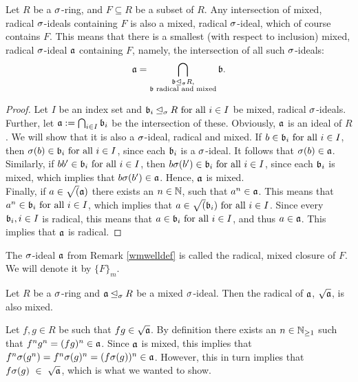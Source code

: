 \begin{rem}\label{wmwelldef}
Let $R$ be a $\sigma$-ring, and $F \subseteq R$ be a subset of $R$. Any intersection of mixed, radical $\sigma$-ideals containing $F$ is also a mixed, radical $\sigma$-ideal, which of course contains $F$. 
This means that there is a smallest (with respect to inclusion) mixed, radical $\sigma$-ideal $\mathfrak{a}$ containing $F$, namely, the intersection of all such $\sigma$-ideals:
\begin{align*} \mathfrak{a} = \bigcap_{\substack{ \mathfrak{b} \unlhd_{\sigma} R, \\ \mathfrak{b} \text{ radical and mixed}}} \mathfrak{b}. \end{align*}
\begin{proof}
Let $I$ be an index set and $\mathfrak{b}_i \unlhd_{\sigma} R \text{ for all } i \in I$ be mixed, radical $\sigma$-ideals. Further, let $\mathfrak{a} := \bigcap_{i \in I} \mathfrak{b}_i$ be the intersection of these. Obviously, $\mathfrak{a}$ is an ideal of $R$. We will show that it is also a $\sigma$-ideal, radical and mixed.
If $b \in \mathfrak{b}_i \text{ for all } i \in I$, then $\sigma(b) \in \mathfrak{b}_i \text{ for all } i \in I$, since each $\mathfrak{b}_i$ is a $\sigma$-ideal.
It follows that $\sigma(b) \in \mathfrak{a}$. \\
\indent Similarly, if $bb' \in \mathfrak{b}_i \text{ for all } i \in I$, then $b \sigma(b') \in \mathfrak{b}_i \text{ for all } i \in I$, since each $\mathfrak{b}_i$ is mixed, which implies that $b \sigma(b') \in \mathfrak{a}$. Hence, $\mathfrak{a}$ is mixed.  \\
\indent Finally, if $a \in \sqrt(\mathfrak{a})$ there exists an $n \in \mathbb{N}$, such that $a^n \in \mathfrak{a}$. This means that $a^n \in \mathfrak{b}_i \text{ for all } i \in I$, which implies that $a \in \sqrt(\mathfrak{b}_i) \text{ for all } i \in I$. Since every $\mathfrak{b}_i, i \in I$ is radical, this means that $a \in \mathfrak{b}_i \text{ for all } i \in I$,
and thus $a \in \mathfrak{a}$. This implies that $\mathfrak{a}$ is radical.
\end{proof}
\end{rem}

\begin{defn}
The $\sigma$-ideal $\mathfrak{a}$ from Remark \ref{wmwelldef} is called the radical, mixed closure of $F$. We will denote it by $\{F\}_{m}$.
\end{defn}


\begin{lem}\label{sqrtmixed}
Let $R$ be a $\sigma$-ring and $\mathfrak{a} \unlhd_{\sigma} R$ be a mixed $\sigma$-ideal. Then the radical of $\mathfrak{a}$, $\sqrt{\mathfrak{a}}$, is also mixed.
\begin{bew}
Let $f,g \in R$ be such that $fg \in \sqrt {\mathfrak{a}}$. By definition there exists an $n \in \mathbb{N}_{\geq1}$ such that $f^n g^n = (fg)^n \in \mathfrak{a}$. Since $\mathfrak{a}$ is mixed, this implies that $f^n \sigma(g^n) = f^n \sigma(g)^n = (f\sigma(g))^n \in \mathfrak{a}$. 
However, this in turn implies that $f\sigma(g)~\in~\sqrt {\mathfrak{a}}$, which is what we wanted to show.
\end{bew}
\end{lem}


